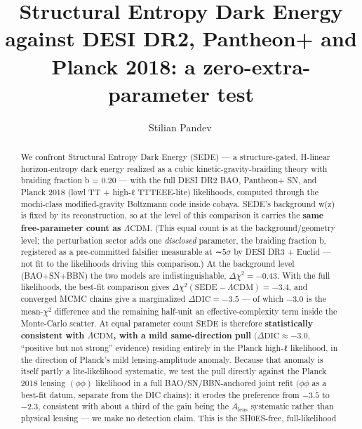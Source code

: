\documentclass[preprint,12pt]{elsarticle}
\begin{document}
\begin{frontmatter}

\title{Structural Entropy Dark Energy against DESI DR2, Pantheon+ and
Planck 2018: a zero-extra-parameter test}

\author[ind]{Stilian Pandev\,}
\address[ind]{Independent researcher}

\begin{abstract}
We confront Structural Entropy Dark Energy (SEDE) --- a structure-gated,
H-linear horizon-entropy dark energy realized as a cubic
kinetic-gravity-braiding theory with braiding fraction b = 0.20 --- with
the full DESI DR2 BAO, Pantheon+ SN, and Planck 2018 (lowl TT + high-ℓ
TTTEEE-lite) likelihoods, computed through the mochi-class
modified-gravity Boltzmann code inside cobaya. SEDE's background w(z) is
fixed by its reconstruction, so at the level of this comparison it
carries the \textbf{same free-parameter count as
\(\Lambda \mathrm{CDM}\)}. (This equal count is at the
background/geometry level; the perturbation sector adds one
\emph{disclosed} parameter, the braiding fraction b, registered as a
pre-committed falsifier measurable at ∼\(5\sigma\) by DESI DR3 + Euclid
--- not fit to the likelihoods driving this comparison.) At the
background level (BAO+SN+BBN) the two models are indistinguishable,
\(\Delta \chi ^{2} = -0.43\). With the full likelihoods, the best-fit
comparison gives
\(\Delta \chi ^{2}(\mathrm{SEDE}-\Lambda \mathrm{CDM}) = -3.4\), and
converged MCMC chains give a marginalized
\textbf{\(\Delta \mathrm{DIC} = -3.5\)} --- of which \(-3.0\) is the
mean-\(\chi ^{2}\) difference and the remaining half-unit an
effective-complexity term inside the Monte-Carlo scatter. At equal
parameter count SEDE is therefore \textbf{statistically consistent with
\(\Lambda \mathrm{CDM}\), with a mild same-direction pull}
\((\Delta \mathrm{DIC} \approx  -3.0\), ``positive but not strong''
evidence) residing entirely in the Planck high-ℓ likelihood, in the
direction of Planck's mild lensing-amplitude anomaly. Because that
anomaly is itself partly a lite-likelihood systematic, we test the pull
directly against the Planck 2018 lensing \((\phi \phi )\) likelihood in
a full BAO/SN/BBN-anchored joint refit \((\phi \phi\) as a best-fit
datum, separate from the DIC chains): it erodes the preference from
\(-3.5\) to \(-2.3\), consistent with about a third of the gain being
the \(A_{\mathrm{lens}}\) systematic rather than physical lensing --- we
make no detection claim. This is the SH0ES-free, full-likelihood

\end{abstract}
\end{frontmatter}
\end{document}
